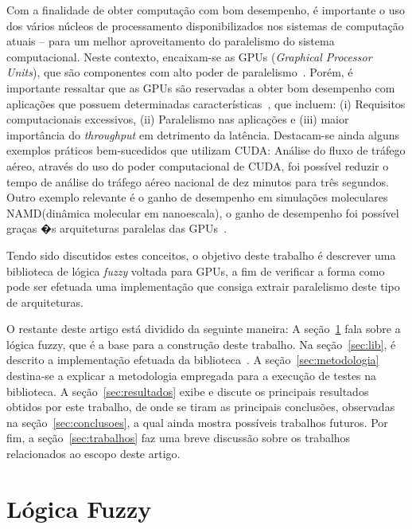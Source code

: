 \documentclass[12pt]{article}
\begin{document}
	Com a finalidade de obter computação com bom desempenho, é importante o uso dos vários núcleos de processamento disponibilizados nos sistemas de computação atuais -- para um melhor aproveitamento do paralelismo do sistema computacional. Neste contexto, encaixam-se as GPUs (\textit{Graphical Processor Units}), que são componentes com alto poder de paralelismo~\cite{sengupta:07}. Porém, é importante ressaltar que as GPUs são reservadas a obter bom desempenho com aplicações que possuem determinadas características~\cite{owens:08}, que incluem: (i) Requisitos computacionais excessivos, (ii) Paralelismo nas aplicações e (iii) maior importância do \textit{throughput} em detrimento da latência. Destacam-se ainda alguns exemplos práticos bem-sucedidos que utilizam CUDA:
Análise do fluxo de tráfego aéreo, através do uso do poder computacional de CUDA, foi possível reduzir o tempo de análise do tráfego aéreo nacional
de dez minutos para três segundos. Outro exemplo relevante é o ganho de desempenho em simulações moleculares NAMD(dinâmica molecular em nanoescala), o ganho de desempenho foi possível graças �s arquiteturas paralelas das GPUs~\cite{nvidia:15}.


	Tendo sido discutidos estes conceitos, o objetivo deste trabalho é descrever uma biblioteca de lógica \textit{fuzzy} voltada para GPUs, a fim de verificar a forma como pode ser efetuada uma implementação que consiga extrair paralelismo deste tipo de arquiteturas.
	

	O restante deste artigo está dividido da seguinte maneira: A seção~\ref{sec:logfuzzy} fala sobre a lógica fuzzy, que é a base para a construção deste trabalho. Na seção~\ref{sec:lib}, é descrito a implementação efetuada da biblioteca~\libname. A seção~\ref{sec:metodologia} destina-se a explicar a metodologia empregada para a execução de testes na biblioteca. A seção~\ref{sec:resultados} exibe e discute os principais resultados obtidos por este trabalho, de onde se tiram as principais conclusões, observadas na seção~\ref{sec:conclusoes}, a qual ainda mostra possíveis trabalhos futuros. Por fim, a seção~\ref{sec:trabalhos} faz uma breve discussão sobre os trabalhos relacionados ao escopo deste artigo.

\section{Lógica Fuzzy}
\label{sec:logfuzzy}
\end{document}
